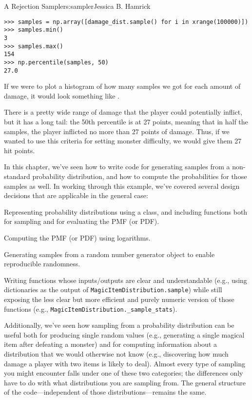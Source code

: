 \begin{aosachapter}{A Rejection Sampler}{s:sampler}{Jessica B. Hamrick}
\begin{verbatim}
>>> samples = np.array([damage_dist.sample() for i in xrange(100000)])
>>> samples.min()
3
>>> samples.max()
154
>>> np.percentile(samples, 50)
27.0
\end{verbatim}

If we were to plot a histogram of how many samples we got for each
amount of damage, it would look something like
.


There is a pretty wide range of damage that the player could potentially
inflict, but it has a long tail: the 50th percentile is at 27 points,
meaning that in half the samples, the player inflicted no more than 27
points of damage. Thus, if we wanted to use this criteria for setting
monster difficulty, we would give them 27 hit points.

\label{summary}

In this chapter, we've seen how to write code for generating samples
from a non-standard probability distribution, and how to compute the
probabilities for those samples as well. In working through this
example, we've covered several design decisions that are applicable in
the general case:

\begin{aosaenumerate}
\def\labelenumi{\arabic{enumi}.}

\item
  Representing probability distributions using a class, and including
  functions both for sampling and for evaluating the PMF (or PDF).
\item
  Computing the PMF (or PDF) using logarithms.
\item
  Generating samples from a random number generator object to enable
  reproducible randomness.
\item
  Writing functions whose inputs/outputs are clear and understandable
  (e.g., using dictionaries as the output of
  \texttt{MagicItemDistribution.sample}) while still exposing the less
  clear but more efficient and purely numeric version of those functions
  \linebreak (e.g., \texttt{MagicItemDistribution.\_sample\_stats}).
\end{aosaenumerate}

Additionally, we've seen how sampling from a probability distribution
can be useful both for producing single random values (e.g., generating
a single magical item after defeating a monster) and for computing
information about a distribution that we would otherwise not know (e.g.,
discovering how much damage a player with two items is likely to deal).
Almost every type of sampling you might encounter falls under one of
these two categories; the differences only have to do with what
distributions you are sampling from. The general structure of the
code---independent of those distributions---remains the same.

\end{aosachapter}
